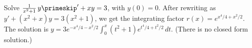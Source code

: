 {Solve $\frac{1}{x^2+1} \, y\primeskip' + x y = 3$, with $y(0) = 0$.}
{After rewriting as $y'+(x^2+x)y=3(x^2+1)$, we get the integrating factor $r(x) = e^{x^4/4+x^2/2}$.\\
The solution is $y=3e^{-x^4/4-x^2/2}\int_0^x(t^2+1)e^{t^4/4+t^2/2}\,dt$. (There is no closed form solution.)}